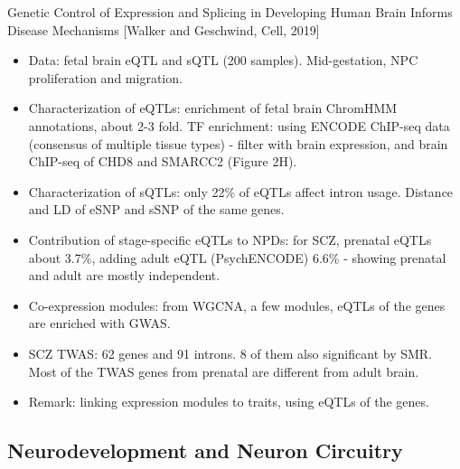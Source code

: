 \documentclass{report}
\begin{document}
Genetic Control of Expression and Splicing in Developing Human Brain Informs Disease Mechanisms [Walker and Geschwind, Cell, 2019]
\begin{itemize}
	\item Data: fetal brain eQTL and sQTL (200 samples). Mid-gestation, NPC proliferation and migration.
	
	\item Characterization of eQTLs: enrichment of fetal brain ChromHMM annotations, about 2-3 fold. TF enrichment: using ENCODE ChIP-seq data (consensus of multiple tissue types) - filter with brain expression, and brain ChIP-seq of CHD8 and SMARCC2 (Figure 2H).
	
	\item Characterization of sQTLs: only 22\% of eQTLs affect intron usage. Distance and LD of eSNP and sSNP of the same genes.
	
	\item Contribution of stage-specific eQTLs to NPDs: for SCZ, prenatal eQTLs about 3.7\%, adding adult eQTL (PsychENCODE) 6.6\% - showing prenatal and adult are mostly independent.
	
	\item Co-expression modules: from WGCNA, a few modules, eQTLs of the genes are enriched with GWAS.
	
	\item SCZ TWAS: 62 genes and 91 introns. 8 of them also significant by SMR. Most of the TWAS genes from prenatal are different from adult brain.
	
	\item Remark: linking expression modules to traits, using eQTLs of the genes.
\end{itemize}
\subsection{Neurodevelopment and Neuron Circuitry}
\end{document}
